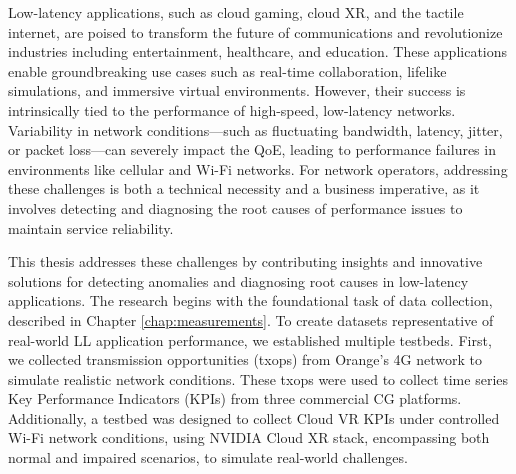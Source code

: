 

Low-latency applications, such as cloud gaming, cloud \ac{XR}, and the tactile internet, are poised to transform the future of communications and revolutionize industries including entertainment, healthcare, and education. These applications enable groundbreaking use cases such as real-time collaboration, lifelike simulations, and immersive virtual environments. However, their success is intrinsically tied to the performance of high-speed, low-latency networks. Variability in network conditions—such as fluctuating bandwidth, latency, jitter, or packet loss—can severely impact the \ac{QoE}, leading to performance failures in environments like cellular and Wi-Fi networks. For network operators, addressing these challenges is both a technical necessity and a business imperative, as it involves detecting and diagnosing the root causes of performance issues to maintain service reliability.

This thesis addresses these challenges by contributing insights and innovative solutions for detecting anomalies and diagnosing root causes in low-latency applications. The research begins with the foundational task of data collection, described in Chapter \ref{chap:measurements}. To create datasets representative of real-world LL application performance, we established multiple testbeds. First, we collected transmission opportunities (txops) from Orange's 4G network to simulate realistic network conditions. These txops were used to collect time series Key Performance Indicators (KPIs) from three commercial CG platforms. Additionally, a testbed was designed to collect Cloud VR KPIs under controlled Wi-Fi network conditions, using NVIDIA Cloud XR stack, encompassing both normal and impaired scenarios, to simulate real-world challenges.

